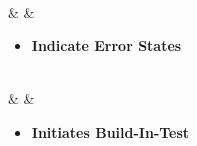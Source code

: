 \documentclass[fontInter]{TechCheck}
\begin{document}
\begin{listlongtable}
\begin{minipage}[t]{\linewidth}
		\end{minipage} \\
		\midrule
		\textbf{\textbullet} &  &
		\begin{minipage}[t]{\linewidth}
			\vspace{-7pt}
			\begin{itemize}
				\item \textbf{Indicate Error States}
			\end{itemize}
		\end{minipage} \\
		\midrule
		\textbf{\textbullet} &  &
		\begin{minipage}[t]{\linewidth}
			\vspace{-7pt}
			\begin{itemize}
				\item \textbf{Initiates Build-In-Test}
			\end{itemize}
		\end{minipage} \\
	\end{listlongtable}

	\hypertarget{subsec:lantirncontrolsstick}{}
\end{document}
